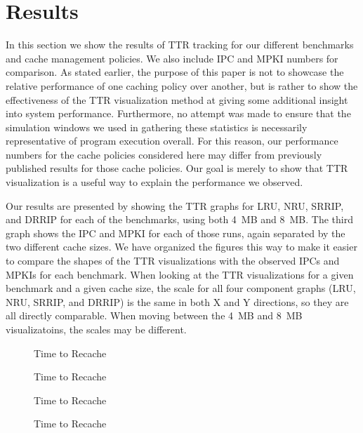 \section{Results}

In this section we show the results of TTR tracking for our different
benchmarks and cache management policies.  We also include IPC and
MPKI numbers for comparison.  As stated
earlier, the purpose of this paper is not to showcase the relative
performance of one caching policy over another, but is rather to show
the effectiveness of the TTR visualization method at giving some
additional insight into system performance.
Furthermore, no attempt was made to ensure that the simulation windows
we used in gathering these statistics is necessarily representative of
program execution overall.  For this reason, our performance numbers
for the cache policies considered here may differ from previously published
results for those cache policies.  Our goal is merely to show that TTR
visualization is a useful way to explain the performance we observed.

Our results are presented by showing the TTR graphs for LRU, NRU,
SRRIP, and DRRIP for each of the benchmarks, using both 4~MB and
8~MB.  The third graph shows the IPC and MPKI for each of those runs,
again separated by the two different cache sizes.  We have organized
the figures this way to make it easier to compare the shapes of the
TTR visualizations with the observed IPCs and MPKIs for each
benchmark.  When looking at the TTR visualizations for a given
benchmark and a given cache size, the scale for all four component
graphs (LRU, NRU, SRRIP, and DRRIP) is the same in both X and Y
directions, so they are all directly comparable.  When moving between
the 4~MB and 8~MB visualizatoins, the scales may be different.

\begin{figure}
\caption{Time to Recache}
\label{Fig:performance}
\end{figure}
\begin{figure}
\caption{Time to Recache}
\label{Fig:performance}
\end{figure}
\begin{figure}
\caption{Time to Recache}
\label{Fig:performance}
\end{figure}
\begin{figure}
\caption{Time to Recache}
\label{Fig:performance}
\end{figure}

